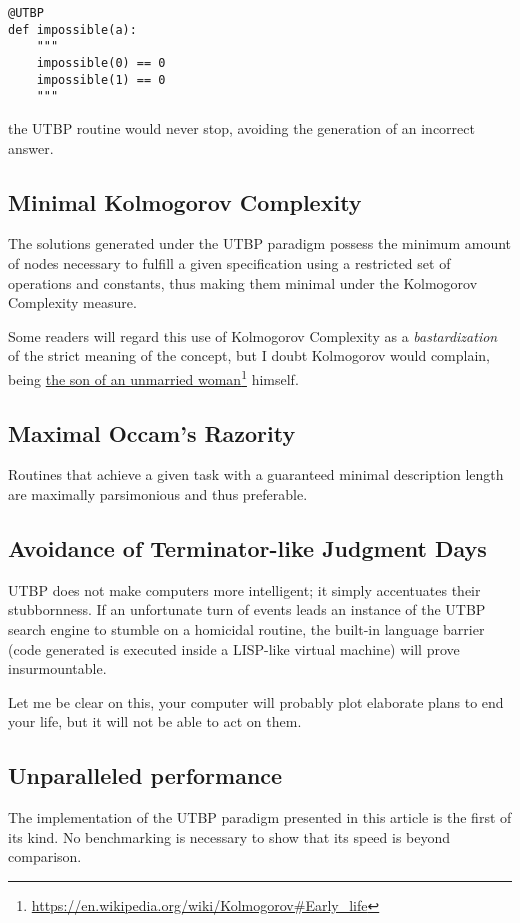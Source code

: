 \documentclass[12pt,twocolumn]{article}
\newcommand\fnurl[2]{%
  \href{#1}{#2}\footnote{\url{#1}}%
}
\begin{document}
\begin{verbatim}
@UTBP
def impossible(a):
    """
    impossible(0) == 0
    impossible(1) == 0
    """
\end{verbatim}

the UTBP routine would never stop, avoiding the generation of an incorrect answer.

\subsection{Minimal Kolmogorov Complexity}
The solutions generated under the UTBP paradigm possess the minimum amount of nodes necessary to fulfill a given specification using a restricted set of operations and constants, thus making them minimal under the Kolmogorov Complexity measure. 

Some readers will regard this use of Kolmogorov Complexity as a \emph{bastardization} of the strict meaning of the concept, but I doubt Kolmogorov would complain, being \fnurl{https://en.wikipedia.org/wiki/Kolmogorov\#Early\_life}{the son of an unmarried woman} himself.

\subsection{Maximal Occam's Razority}
Routines that achieve a given task with a guaranteed minimal description length are maximally parsimonious and thus preferable.

\subsection{Avoidance of Terminator-like Judgment Days}
UTBP does not make computers more intelligent; it simply accentuates their stubbornness. If an unfortunate turn of events leads an instance of the UTBP search engine to stumble on a homicidal routine, the built-in language barrier (code generated is executed inside a LISP-like virtual machine) will prove insurmountable.

Let me be clear on this, your computer will probably plot elaborate plans to end your life, but it will not be able to act on them.

\subsection{Unparalleled performance}
The implementation of the UTBP paradigm presented in this article is the first of its kind. No benchmarking is necessary to show that its speed is beyond comparison.
\end{document}

